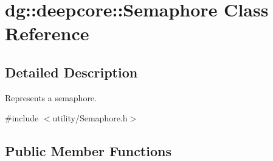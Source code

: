 \hypertarget{classdg_1_1deepcore_1_1_semaphore}{}\section{dg\+:\+:deepcore\+:\+:Semaphore Class Reference}
\label{classdg_1_1deepcore_1_1_semaphore}


\subsection{Detailed Description}
Represents a semaphore. 

{\ttfamily \#include $<$utility/\+Semaphore.\+h$>$}

\subsection*{Public Member Functions}
